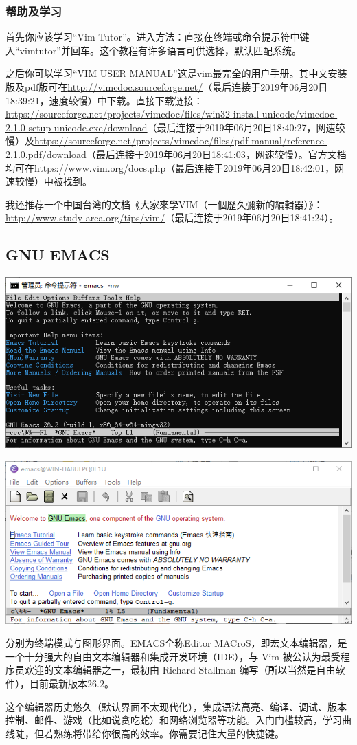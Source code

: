 \subsubsection{帮助及学习}
首先你应该学习“Vim Tutor”。进入方法：直接在终端或命令提示符中键入“vimtutor”并回车。这个教程有许多语言可供选择，默认匹配系统。\par
之后你可以学习“VIM USER MANUAL”这是vim最完全的用户手册。其中文安装版及pdf版可在\url{http://vimcdoc.sourceforge.net/}（最后连接于2019年06月20日18:39:21，速度较慢）中下载。直接下载链接：\url{https://sourceforge.net/projects/vimcdoc/files/win32-install-unicode/vimcdoc-2.1.0-setup-unicode.exe/download}（最后连接于2019年06月20日18:40:27，网速较慢）及\url{https://sourceforge.net/projects/vimcdoc/files/pdf-manual/reference-2.1.0.pdf/download}（最后连接于2019年06月20日18:41:03，网速较慢）。官方文档均可在\url{https://www.vim.org/docs.php}（最后连接于2019年06月20日18:42:01，网速较慢）中被找到。\par
我还推荐一个中国台湾的文档《大家來學VIM（一個歷久彌新的編輯器）》：\url{http://www.study-area.org/tips/vim/}（最后连接于2019年06月20日18:41:24）。
\subsection{GNU EMACS}
\begin{center}
	\includegraphics[scale=0.8]{pic/emacs-terminal}\par   \includegraphics[scale=0.8]{pic/Emacs-GUI}
\end{center} \par
分别为终端模式与图形界面。EMACS全称Editor MACroS，即宏文本编辑器，是一个十分强大的自由文本编辑器和集成开发环境（IDE），与 Vim 被公认为最受程序员欢迎的文本编辑器之一，最初由 Richard Stallman 编写（所以当然是自由软件），目前最新版本26.2。\par
这个编辑器历史悠久（默认界面不太现代化），集成语法高亮、编译、调试、版本控制、邮件、游戏（比如说贪吃蛇）和网络浏览器等功能。入门门槛较高，学习曲线陡，但若熟练将带给你很高的效率。你需要记住大量的快捷键。\par
